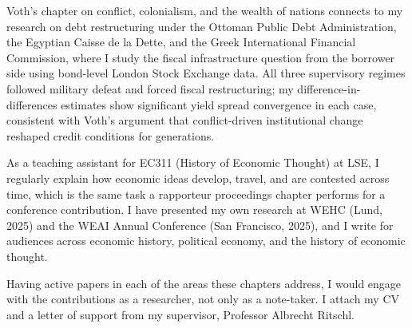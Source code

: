 \documentclass[11pt,a4paper]{article}
\begin{document}
Voth's chapter on conflict, colonialism, and the wealth of nations connects to my research on debt restructuring under the Ottoman Public Debt Administration, the Egyptian Caisse de la Dette, and the Greek International Financial Commission, where I study the fiscal infrastructure question from the borrower side using bond-level London Stock Exchange data. All three supervisory regimes followed military defeat and forced fiscal restructuring; my difference-in-differences estimates show significant yield spread convergence in each case, consistent with Voth's argument that conflict-driven institutional change reshaped credit conditions for generations.

As a teaching assistant for EC311 (History of Economic Thought) at LSE, I regularly explain how economic ideas develop, travel, and are contested across time, which is the same task a rapporteur proceedings chapter performs for a conference contribution. I have presented my own research at WEHC (Lund, 2025) and the WEAI Annual Conference (San Francisco, 2025), and I write for audiences across economic history, political economy, and the history of economic thought.

Having active papers in each of the areas these chapters address, I would engage with the contributions as a researcher, not only as a note-taker. I attach my CV and a letter of support from my supervisor, Professor Albrecht Ritschl.
\end{document}
